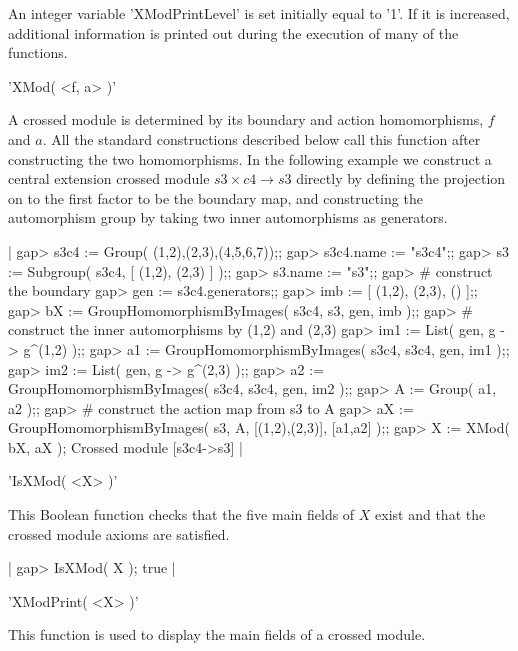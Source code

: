 An integer variable 'XModPrintLevel'   is set initially equal to  '1'.
If it is increased, additional  information is printed out during  the
execution of many of the functions.



'XMod( <f, a> )'

A   crossed   module is   determined  by    its  boundary and   action
homomorphisms, $f$ and $a$.  All  the standard constructions described
below call this function after constructing the two homomorphisms.  In
the following example we construct  a central extension crossed module
$s3 \times c4 \to s3$  directly by defining the  projection on to  the
first factor to be the boundary map, and constructing the automorphism
group by taking two inner automorphisms as generators.

|    gap> s3c4 := Group( (1,2),(2,3),(4,5,6,7));;
    gap> s3c4.name := "s3c4";;
    gap> s3 := Subgroup( s3c4, [ (1,2), (2,3) ] );;
    gap> s3.name := "s3";;
    gap> # construct the boundary
    gap> gen := s3c4.generators;;
    gap> imb := [ (1,2), (2,3), () ];;
    gap> bX := GroupHomomorphismByImages( s3c4, s3, gen, imb );;
    gap> # construct the inner automorphisms by (1,2) and (2,3)
    gap> im1 := List( gen, g -> g^(1,2) );;
    gap> a1 := GroupHomomorphismByImages( s3c4, s3c4, gen, im1 );;
    gap> im2 := List( gen, g -> g^(2,3) );;
    gap> a2 := GroupHomomorphismByImages( s3c4, s3c4, gen, im2 );;
    gap> A := Group( a1, a2 );;
    gap> # construct the action map from s3 to A
    gap> aX := GroupHomomorphismByImages( s3, A, [(1,2),(2,3)], [a1,a2] );;
    gap> X := XMod( bX, aX );
    Crossed module [s3c4->s3]  |

%

'IsXMod( <X> )'

This Boolean function  checks that the five  main fields of  $X$ exist
and that the crossed module axioms are satisfied.

|    gap> IsXMod( X );
    true |

%

'XModPrint( <X> )'

This function is used to display the main fields of a crossed module.

